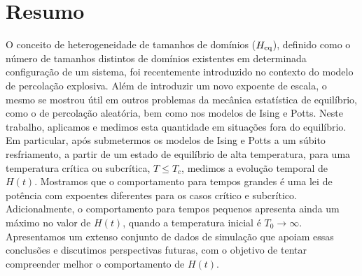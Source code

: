 \chapter*{Resumo}

O conceito de heterogeneidade de tamanhos de domínios ($H_{\scriptsize\rm eq}$), definido como o número de tamanhos distintos de domínios existentes em determinada configuração de um sistema, foi recentemente introduzido no contexto do modelo de percolação explosiva. Além de introduzir um novo expoente de escala, o mesmo se mostrou útil em outros problemas da mecânica estatística de equilíbrio, como o de percolação aleatória, bem como nos modelos de Ising e Potts. Neste trabalho, aplicamos e medimos esta quantidade em situações fora do equilíbrio. Em particular, após submetermos os modelos de Ising e Potts a um súbito resfriamento, a partir de um estado de equilíbrio de alta temperatura, para uma temperatura crítica ou subcrítica, $T\leq T_c$, medimos a evolução temporal de $H(t)$. Mostramos que o comportamento para tempos grandes é uma lei de potência com expoentes diferentes para os casos crítico e subcrítico. Adicionalmente, o comportamento para tempos pequenos apresenta ainda um máximo no valor de $H(t)$, quando a temperatura inicial é $T_0\to\infty$. Apresentamos um extenso conjunto de dados de simulação que apoiam essas conclusões e discutimos perspectivas futuras, com o objetivo de tentar compreender melhor o comportamento de $H(t)$.

